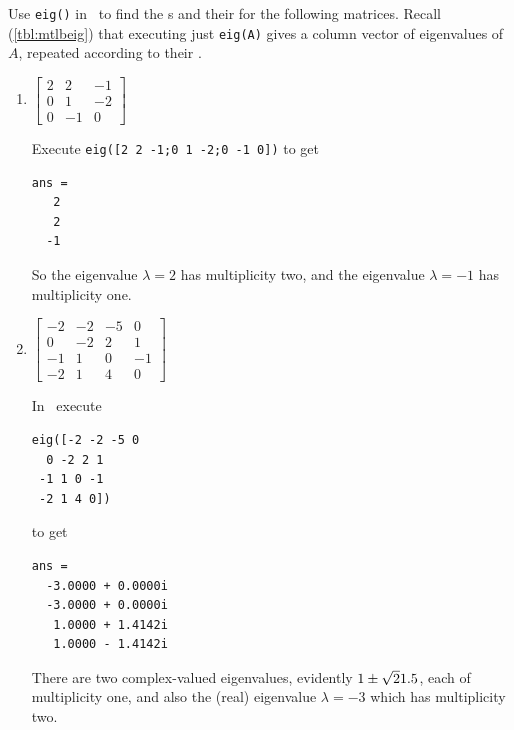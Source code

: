 \begin{example} \label{eg:multeval}
Use \verb|eig()| in \script\  to find the s and their  for the following matrices.
Recall (\autoref{tbl:mtlbeig}) that executing just \verb|eig(A)| gives a column vector of eigenvalues of~\(A\), repeated according to their . 
\begin{enumerate}
\item \(\begin{bmatrix}2&2&-1
\\0&1&-2
\\0&-1&0\end{bmatrix}\)
\begin{solution} 
Execute \verb|eig([2 2 -1;0 1 -2;0 -1 0])| to get
\setbox\ajrqrbox\hbox{}%
\marginpar{\usebox{\ajrqrbox}}%
\begin{verbatim}
ans =
   2
   2
  -1
\end{verbatim}
So the eigenvalue \(\lambda=2\) has multiplicity two, and the eigenvalue \(\lambda=-1\) has multiplicity one.
\end{solution}

\item \(\begin{bmatrix}-2&-2&-5&0
\\0&-2&2&1
\\-1&1&0&-1
\\-2&1&4&0\end{bmatrix}\)
\begin{solution} 
In \script\ execute
\begin{verbatim}
eig([-2 -2 -5 0
  0 -2 2 1
 -1 1 0 -1
 -2 1 4 0])
\end{verbatim}
\setbox\ajrqrbox\hbox{}%
\marginpar{\usebox{\ajrqrbox}}%
to get
\begin{verbatim}
ans =
  -3.0000 + 0.0000i
  -3.0000 + 0.0000i
   1.0000 + 1.4142i
   1.0000 - 1.4142i
\end{verbatim}
There are two complex-valued eigenvalues, evidently \(1\pm\sqrt21.5\), each of multiplicity one, and also the (real) eigenvalue \(\lambda=-3\) which has multiplicity two.
\end{solution}


\end{enumerate}
\end{example}
